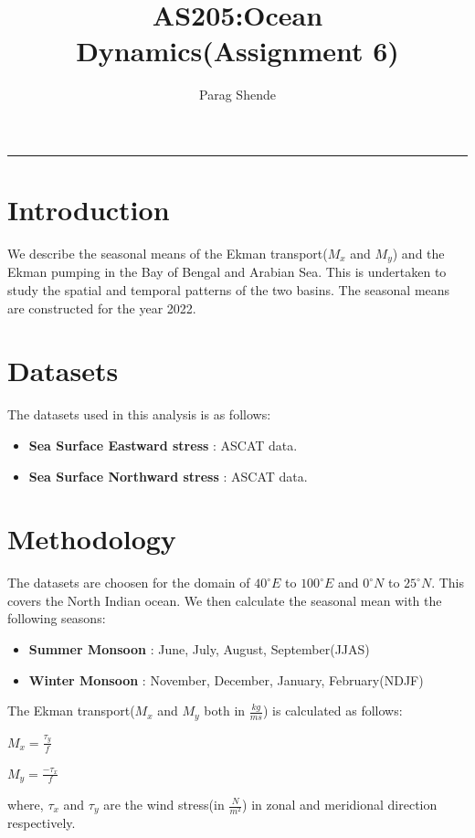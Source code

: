 \documentclass[20pt]{article}
\title{AS205:Ocean Dynamics(Assignment 6)}
\author{Parag Shende}
\begin{document}
\maketitle
\hrule

\section*{Introduction}

We describe the seasonal means of the Ekman transport($M_{x}$ and $M_{y}$) and the Ekman pumping in the Bay of Bengal and Arabian Sea. This is 
undertaken to study the spatial and temporal patterns of the two basins. The seasonal means are constructed for the year 2022.

\section*{Datasets}

The datasets used in this analysis is as follows:

\begin{itemize}
    \item \textbf{Sea Surface Eastward stress} : ASCAT data.
    \item \textbf{Sea Surface Northward stress} : ASCAT data.
\end{itemize}

\section*{Methodology}

The datasets are choosen for the domain of $40^{\circ} E$ to $100^{\circ}E$ and $0^{\circ} N$ to $25^{\circ} N$. This covers the
North Indian ocean. We then calculate the seasonal mean with the following seasons:
\begin{itemize}
    \item \textbf{Summer Monsoon} : June, July, August, September(JJAS)
    \item \textbf{Winter Monsoon} : November, December, January, February(NDJF)
\end{itemize}

The Ekman transport($M_{x}$ and $M_{y}$ both in $\frac{kg}{m s}$) is calculated as follows:
\begin{center}
    $M_{x} = \frac{\tau_{y}}{f}$

    $M_{y} = \frac{-\tau_{x}}{f}$    
\end{center}

where,
$\tau_{x}$ and $\tau_{y}$ are the wind stress(in $\frac{N}{m^{2}}$) in zonal and meridional direction respectively. 
\end{document}
